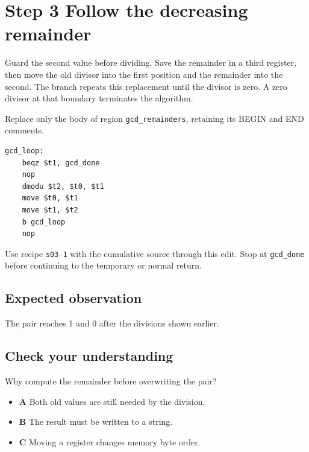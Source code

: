 \section{Step 3 Follow the decreasing remainder}\label{rsa-s03}

Guard the second value before dividing. Save the remainder in a third register, then move the old divisor into the first position and the remainder into the second. The branch repeats this replacement until the divisor is zero. A zero divisor at that boundary terminates the algorithm.

Replace only the body of region \texttt{gcd\_remainders}, retaining its BEGIN and END comments.

\begin{verbatim}
gcd_loop:
    beqz $t1, gcd_done
    nop
    dmodu $t2, $t0, $t1
    move $t0, $t1
    move $t1, $t2
    b gcd_loop
    nop
\end{verbatim}

Use recipe \texttt{s03-1} with the cumulative source through this edit. Stop at \texttt{gcd\_done} before continuing to the temporary or normal return.

\subsection{Expected observation}
The pair reaches 1 and 0 after the divisions shown earlier.

\subsection{Check your understanding}
Why compute the remainder before overwriting the pair?

\begin{itemize}
\item \textbf{A} Both old values are still needed by the division.
\item \textbf{B} The result must be written to a string.
\item \textbf{C} Moving a register changes memory byte order.
\end{itemize}
